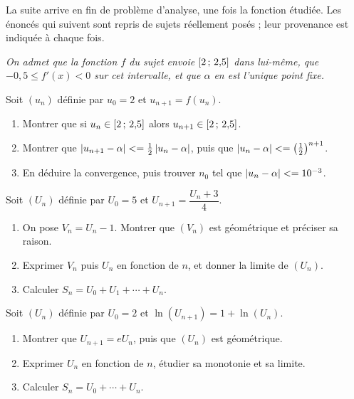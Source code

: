 \begin{annales}
La suite arrive en fin de problème d'analyse, une fois la fonction étudiée.
Les énoncés qui suivent sont repris de sujets réellement posés ; leur
provenance est indiquée à chaque fois.

\emph{On admet que la fonction $f$ du sujet envoie $\left[2\,;\,2{,}5\right]$
dans lui-même, que $-0{,}5 \leq f'(x) < 0$ sur cet intervalle, et que $\alpha$
en est l'unique point fixe.}

Soit $(u_{n})$ définie par $u_{0} = 2$ et $u_{n+1} = f(u_{n})$.
\begin{enumerate}[label=\textbf{\alph*)}, leftmargin=*, itemsep=0.15em]
  \item Montrer que si $u_{n} \in \left[2\,;\,2{,}5\right]$ alors
        $u_{n+1} \in \left[2\,;\,2{,}5\right]$.
  \item Montrer que $\left|u_{n+1}-\alpha\right| <= \frac12\left|u_{n}-\alpha\right|$,
        puis que $\left|u_{n}-\alpha\right| <=
        \left(\frac12\right)^{n+1}$.
  \item En déduire la convergence, puis trouver $n_{0}$ tel que
        $\left|u_{n}-\alpha\right| <= 10^{-3}$.
\end{enumerate}

Soit $(U_{n})$ définie par $U_{0} = 5$ et
$U_{n+1} = \dfrac{U_{n}+3}{4}$.
\begin{enumerate}[label=\textbf{\alph*)}, leftmargin=*, itemsep=0.15em]
  \item On pose $V_{n} = U_{n}-1$. Montrer que $(V_{n})$ est géométrique et
        préciser sa raison.
  \item Exprimer $V_{n}$ puis $U_{n}$ en fonction de $n$, et donner la limite
        de $(U_{n})$.
  \item Calculer $S_{n} = U_{0}+U_{1}+\cdots+U_{n}$.
\end{enumerate}

Soit $(U_{n})$ définie par $U_{0} = 2$ et
$\ln\!\left(U_{n+1}\right) = 1+\ln\!\left(U_{n}\right)$.
\begin{enumerate}[label=\textbf{\alph*)}, leftmargin=*, itemsep=0.15em]
  \item Montrer que $U_{n+1} = eU_{n}$, puis que $(U_{n})$ est géométrique.
  \item Exprimer $U_{n}$ en fonction de $n$, étudier sa monotonie et sa
        limite.
  \item Calculer $S_{n} = U_{0}+\cdots+U_{n}$.
\end{enumerate}


\end{annales}
